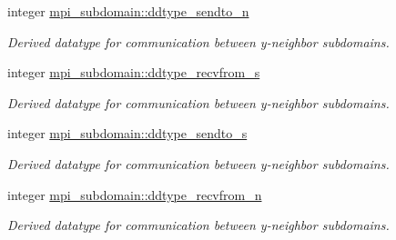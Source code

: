 \textbf{ }\par
\begin{DoxyCompactItemize}
\item 
integer \mbox{\hyperlink{namespacempi__subdomain_a55f5c1af9bd941fd176e619bddbb8d82}{mpi\+\_\+subdomain\+::ddtype\+\_\+sendto\+\_\+n}}
\begin{DoxyCompactList}\small\item\em Derived datatype for communication between y-\/neighbor subdomains. \end{DoxyCompactList}\item 
integer \mbox{\hyperlink{namespacempi__subdomain_a1f46916f08758533cad3ecac33233e38}{mpi\+\_\+subdomain\+::ddtype\+\_\+recvfrom\+\_\+s}}
\begin{DoxyCompactList}\small\item\em Derived datatype for communication between y-\/neighbor subdomains. \end{DoxyCompactList}\item 
integer \mbox{\hyperlink{namespacempi__subdomain_a660f83d621188fb7eb60ad10eab4c9b5}{mpi\+\_\+subdomain\+::ddtype\+\_\+sendto\+\_\+s}}
\begin{DoxyCompactList}\small\item\em Derived datatype for communication between y-\/neighbor subdomains. \end{DoxyCompactList}\item 
integer \mbox{\hyperlink{namespacempi__subdomain_a74f1edb3c9227692b250285680518dc4}{mpi\+\_\+subdomain\+::ddtype\+\_\+recvfrom\+\_\+n}}
\begin{DoxyCompactList}\small\item\em Derived datatype for communication between y-\/neighbor subdomains. \end{DoxyCompactList}\end{DoxyCompactItemize}

